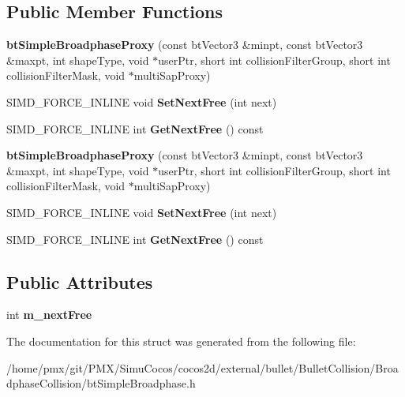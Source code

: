 \subsection*{Public Member Functions}
\begin{DoxyCompactItemize}
\item 
\mbox{\label{structbtSimpleBroadphaseProxy_a26f68d0e3cfa37a84e60fb563e0b939b}} 
{\bfseries bt\+Simple\+Broadphase\+Proxy} (const bt\+Vector3 \&minpt, const bt\+Vector3 \&maxpt, int shape\+Type, void $\ast$user\+Ptr, short int collision\+Filter\+Group, short int collision\+Filter\+Mask, void $\ast$multi\+Sap\+Proxy)
\item 
\mbox{\label{structbtSimpleBroadphaseProxy_a885804174bd59c9bbceece02810b39f5}} 
S\+I\+M\+D\+\_\+\+F\+O\+R\+C\+E\+\_\+\+I\+N\+L\+I\+NE void {\bfseries Set\+Next\+Free} (int next)
\item 
\mbox{\label{structbtSimpleBroadphaseProxy_a7d9db7906236431a12c4d1a1eed72d64}} 
S\+I\+M\+D\+\_\+\+F\+O\+R\+C\+E\+\_\+\+I\+N\+L\+I\+NE int {\bfseries Get\+Next\+Free} () const
\item 
\mbox{\label{structbtSimpleBroadphaseProxy_a26f68d0e3cfa37a84e60fb563e0b939b}} 
{\bfseries bt\+Simple\+Broadphase\+Proxy} (const bt\+Vector3 \&minpt, const bt\+Vector3 \&maxpt, int shape\+Type, void $\ast$user\+Ptr, short int collision\+Filter\+Group, short int collision\+Filter\+Mask, void $\ast$multi\+Sap\+Proxy)
\item 
\mbox{\label{structbtSimpleBroadphaseProxy_a885804174bd59c9bbceece02810b39f5}} 
S\+I\+M\+D\+\_\+\+F\+O\+R\+C\+E\+\_\+\+I\+N\+L\+I\+NE void {\bfseries Set\+Next\+Free} (int next)
\item 
\mbox{\label{structbtSimpleBroadphaseProxy_a7d9db7906236431a12c4d1a1eed72d64}} 
S\+I\+M\+D\+\_\+\+F\+O\+R\+C\+E\+\_\+\+I\+N\+L\+I\+NE int {\bfseries Get\+Next\+Free} () const
\end{DoxyCompactItemize}
\subsection*{Public Attributes}
\begin{DoxyCompactItemize}
\item 
\mbox{\label{structbtSimpleBroadphaseProxy_adaa300f989d56303eb8ff0bd29b94474}} 
int {\bfseries m\+\_\+next\+Free}
\end{DoxyCompactItemize}


The documentation for this struct was generated from the following file\+:\begin{DoxyCompactItemize}
\item 
/home/pmx/git/\+P\+M\+X/\+Simu\+Cocos/cocos2d/external/bullet/\+Bullet\+Collision/\+Broadphase\+Collision/bt\+Simple\+Broadphase.\+h\end{DoxyCompactItemize}
